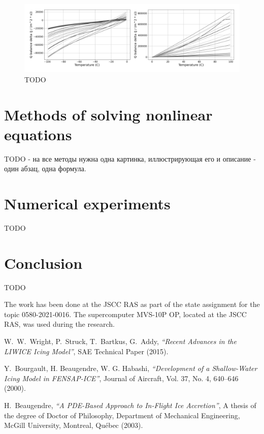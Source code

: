 \documentclass[
11pt,%
tightenlines,%
twoside,%
onecolumn,%
nofloats,%
nobibnotes,%
nofootinbib,%
superscriptaddress,%
noshowpacs,%
centertags]%
{revtex4}
\begin{document}
\begin{figure}[h]
\setcaptionmargin{5mm}
\onelinecaptionstrue
\includegraphics[width=1.0\textwidth]{pics/dq_rime_wet.pdf}
\caption{TODO}\label{fig:dq_rime_wet}
\end{figure}

\section{Methods of solving nonlinear equations}

TODO - на все методы нужна одна картинка, иллюстрирующая его и описание - один абзац, одна формула.

\section{Numerical experiments}

TODO

\section{Conclusion}

TODO

\begin{acknowledgments}
The work has been done at the JSCC RAS as part of the state assignment for the topic 0580-2021-0016.
The supercomputer MVS-10P OP, located at the JSCC RAS, was used during the research.
\end{acknowledgments}

\begin{thebibliography}{99}

W.~W.~Wright, P.~Struck, T.~Bartkus, G.~Addy, {\it ``Recent Advances in the LIWICE Icing Model''}, SAE Technical Paper (2015).

Y.~Bourgault, H. Beaugendre, W. G. Habashi, {\it ``Development of a Shallow-Water Icing Model in FENSAP-ICE''}, Journal of Aircraft, Vol. 37, No. 4, 640--646 (2000).

H.~Beaugendre, {\it ``A PDE-Based Approach to In-Flight Ice Accretion''}, A thesis of the degree of Doctor of Philosophy, Department of Mechanical Engineering, McGill University, Montreal, Qu\'ebec (2003).

\end{thebibliography}
\end{document}
